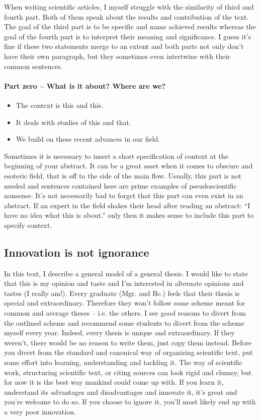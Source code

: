 When writing scientific articles, I myself struggle with the similarity of third and fourth part. Both of them speak about the results and contribution of the text. The goal of the third part is to be specific and name achieved results whereas the goal of the fourth part is to interpret their meaning and significance. I guess it's fine if these two statements merge to an extent and both parts not only don't have their own paragraph, but they sometimes even intertwine with their common sentences.

\paragraph{Part zero -- What is it about? Where are we?}
\begin{itemize}
  \item{The context is this and this.}
  \item{It deals with studies of this and that.}
  \item{We build on these recent advances in our field.}
\end{itemize}

Sometimes it is necessary to insert a short specification of context at the beginning of your abstract. It can be a great asset when it comes to obscure and esoteric field, that is off to the side of the main flow. Usually, this part is not needed and sentences contained here are prime examples of pseudoscientific nonsense. It's not necessarily bad to forget that this part can even exist in an abstract. If an expert in the field shakes their head after reading an abstract: ``I have no idea what this is about.'' only then it makes sense to include this part to specify context.


\subsection*{Innovation is not ignorance}

In this text, I describe a general model of a general thesis. I would like to state that this is my opinion and taste and I'm interested in alternate opinions and tastes (I really am!). Every graduate (Mgr. and Bc.) feels that their thesis is special and extraordinary. Therefore they won't follow some scheme meant for common and average theses -- i.e. the others. I see good reasons to divert from the outlined scheme and recommend some students to divert from the scheme myself every year. Indeed, every thesis is unique and extraordinary. If they weren't, there would be no reason to write them, just copy them instead. Before you divert from the standard and canonical way of organizing scientific text, put some effort into learning, understanding and tackling it. The way of scientific work, structuring scientific text, or citing sources can look rigid and clumsy, but for now it is the best way mankind could come up with. If you learn it, understand its advantages and disadvantages and innovate it, it's great and you're welcome to do so. If you choose to ignore it, you'll most likely end up with a very poor innovation.

